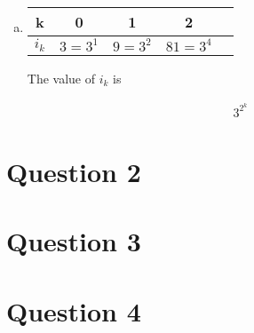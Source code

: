 \documentclass[12pt]{article}
\begin{document}
\begin{enumerate}[a.]
\begin{itemize}
    \end{itemize}

    \item

    \begin{tabular}{|c|c|c|c|c|}
        \hline
        k & 0 & 1 & 2\\
        \hline
        $i_k$ & $3 = 3^1$ & $9 = 3^2$ & $81 = 3^4$\\
        \hline
    \end{tabular}

    \bigskip

    The value of $i_k$ is

    \begin{align}
        3^{2^k}
    \end{align}

\end{enumerate}

\section*{Question 2}

\section*{Question 3}

\section*{Question 4}
\end{document}
